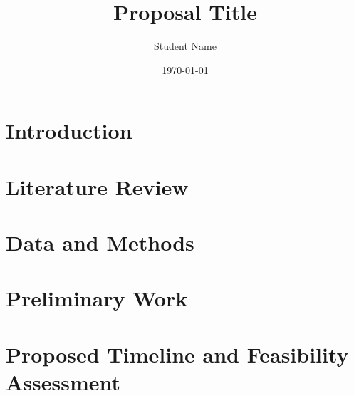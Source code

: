 \documentclass{article}
\title{Proposal Title}
\author{Student Name}
\date{\today}
\begin{document}
\maketitle

\section{Introduction}


\section{Literature Review}


\section{Data and Methods}


\section{Preliminary Work}


\section{Proposed Timeline and Feasibility Assessment}

\end{document}
